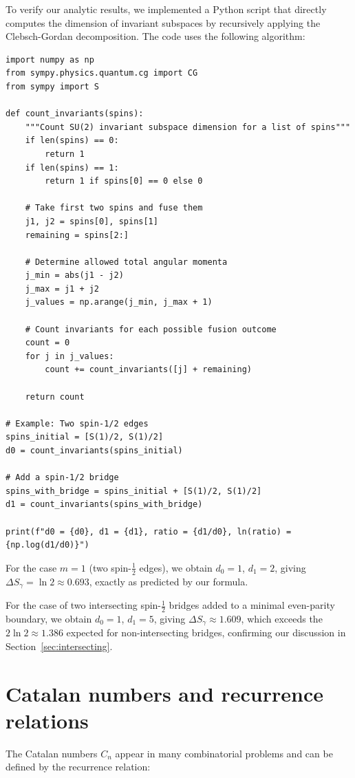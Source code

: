\documentclass[11pt, a4paper]{article}
\theoremstyle{plain}
\theoremstyle{definition}
\theoremstyle{remark}
\begin{document}
To verify our analytic results, we implemented a Python script that directly computes the dimension of invariant subspaces by recursively applying the Clebsch-Gordan decomposition. The code uses the following algorithm:

\begin{verbatim}
import numpy as np
from sympy.physics.quantum.cg import CG
from sympy import S

def count_invariants(spins):
    """Count SU(2) invariant subspace dimension for a list of spins"""
    if len(spins) == 0:
        return 1
    if len(spins) == 1:
        return 1 if spins[0] == 0 else 0
    
    # Take first two spins and fuse them
    j1, j2 = spins[0], spins[1]
    remaining = spins[2:]
    
    # Determine allowed total angular momenta
    j_min = abs(j1 - j2)
    j_max = j1 + j2
    j_values = np.arange(j_min, j_max + 1)
    
    # Count invariants for each possible fusion outcome
    count = 0
    for j in j_values:
        count += count_invariants([j] + remaining)
    
    return count

# Example: Two spin-1/2 edges
spins_initial = [S(1)/2, S(1)/2]
d0 = count_invariants(spins_initial)

# Add a spin-1/2 bridge
spins_with_bridge = spins_initial + [S(1)/2, S(1)/2]
d1 = count_invariants(spins_with_bridge)

print(f"d0 = {d0}, d1 = {d1}, ratio = {d1/d0}, ln(ratio) = {np.log(d1/d0)}")
\end{verbatim}

For the case $m=1$ (two spin-$\frac{1}{2}$ edges), we obtain $d_0=1$, $d_1=2$, giving $\Delta S_{\gamma} = \ln 2 \approx 0.693$, exactly as predicted by our formula.

For the case of two intersecting spin-$\frac{1}{2}$ bridges added to a minimal even-parity boundary, we obtain $d_0=1$, $d_1=5$, giving $\Delta S_{\gamma} \approx 1.609$, which exceeds the $2\ln 2 \approx 1.386$ expected for non-intersecting bridges, confirming our discussion in Section~\ref{sec:intersecting}.

\section{Catalan numbers and recurrence relations}
\label{app:catalan}

The Catalan numbers $C_n$ appear in many combinatorial problems and can be defined by the recurrence relation:
\end{document}
